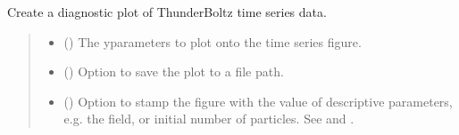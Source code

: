 \documentclass[letterpaper,10pt,english,openany,oneside]{sphinxmanual}
\begin{document}
\begin{fulllineitems}
\begin{fulllineitems}
\label{\detokenize{api/pytb.ThunderBoltz.plot_timeseries:pytb.ThunderBoltz.plot_timeseries}}
\pysigstartsignatures
{}
\pysigstopsignatures
\sphinxAtStartPar
Create a diagnostic plot of ThunderBoltz time series
data.
\begin{quote}\begin{description}
\begin{itemize}
\item {} 
\sphinxAtStartPar
{} (\sphinxstyleliteralemphasis{\sphinxupquote{{[}}}\sphinxstyleliteralemphasis{\sphinxupquote{{]}}}) \textendash{} The y\sphinxhyphen{}parameters to plot onto the time series figure.

\item {} 
\sphinxAtStartPar
{} () \textendash{} Option to save the plot to a file path.

\item {} 
\sphinxAtStartPar
{} (\sphinxstyleliteralemphasis{\sphinxupquote{{[}}}\sphinxstyleliteralemphasis{\sphinxupquote{{]}}}) \textendash{} Option to stamp the figure with the value of
descriptive parameters, e.g. the field, or initial
number of particles. See {\hyperref[\detokenize{api/pytb.parameters.TBParameters:pytb.parameters.TBParameters}]{}}
and {\hyperref[\detokenize{api/pytb.parameters.WrapParameters:pytb.parameters.WrapParameters}]{}}.


\end{itemize}
\end{description}
\end{quote}
\end{fulllineitems}
\end{fulllineitems}
\end{document}
